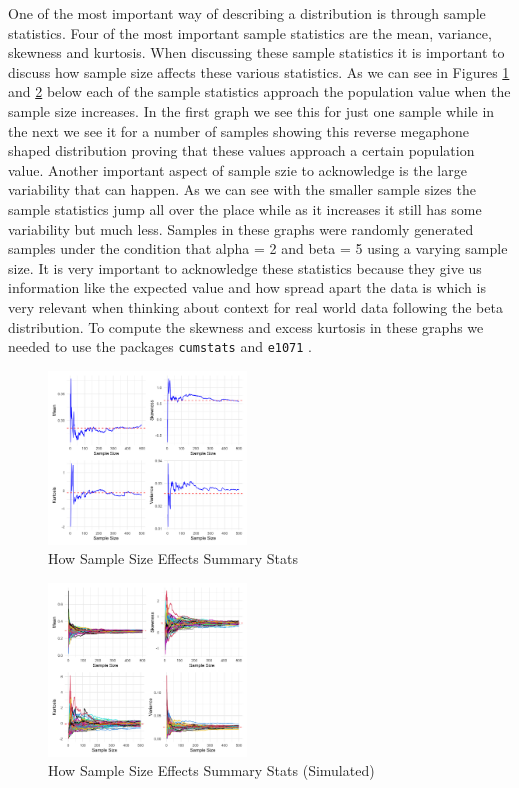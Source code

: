 \documentclass{article}\usepackage[]{graphicx}\usepackage[]{xcolor}
\begin{document}
\begin{multicols}{2}
One of the most important way of describing a distribution is through sample statistics. Four of the most important sample statistics are the mean, variance, skewness and kurtosis. When discussing these sample statistics it is important to discuss how sample size affects these various statistics. As we can see in Figures \ref{Figure 3} and \ref{Figure 4} below each of the sample statistics approach the population value when the sample size increases. In the first graph we see this for just one sample while in the next we see it for a number of samples showing this reverse megaphone shaped distribution proving that these values approach a certain population value. Another important aspect of sample szie to acknowledge is the large variability that can happen. As we can see with the smaller sample sizes the sample statistics jump all over the place while as it increases it still has some variability but much less. Samples in these graphs were randomly generated samples under the condition that alpha = 2 and beta = 5 using a varying sample size. It is very important to acknowledge these statistics because they give us information like the expected value and how spread apart the data is which is very relevant when thinking about context for real world data following the beta distribution. To compute the skewness and excess kurtosis in these graphs we needed to use the packages \texttt{cumstats} and \texttt{e1071} \citep{cumstats} \citep{e1071}. 





\begin{figure}[H]
\centering
\includegraphics[width=0.47\textwidth]{SampStat}  %
\caption{How Sample Size Effects Summary Stats}
\label{Figure 3}
\end{figure}

\begin{figure}[H]
\centering
\includegraphics[width=0.47\textwidth]{SimpSampStat}  %
\caption{How Sample Size Effects Summary Stats (Simulated)}
\label{Figure 4}
\end{figure}



\end{multicols}
\end{document}
